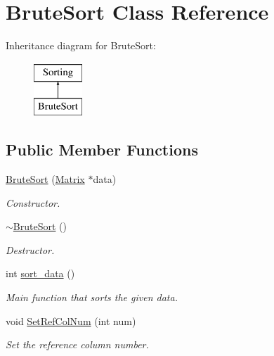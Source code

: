 \hypertarget{classBruteSort}{
\section{BruteSort Class Reference}
\label{d7/d98/classBruteSort}
}
Inheritance diagram for BruteSort:\begin{figure}[H]
\begin{center}
\leavevmode
\includegraphics[height=2cm]{d7/d98/classBruteSort}
\end{center}
\end{figure}
\subsection*{Public Member Functions}
\begin{DoxyCompactItemize}
\item 
\hyperlink{classBruteSort_af173d86f16480c1e08de8cb156d29205}{BruteSort} (\hyperlink{classMatrix}{Matrix} $\ast$data)
\begin{DoxyCompactList}\small\item\em Constructor. \item\end{DoxyCompactList}\item 
\hypertarget{classBruteSort_a0bbf682f921452842e844599b1f02c0a}{
\hyperlink{classBruteSort_a0bbf682f921452842e844599b1f02c0a}{$\sim$BruteSort} ()}
\label{d7/d98/classBruteSort_a0bbf682f921452842e844599b1f02c0a}

\begin{DoxyCompactList}\small\item\em Destructor. \item\end{DoxyCompactList}\item 
int \hyperlink{classBruteSort_ae1345f8f8ddc289832816d900226fc1e}{sort\_\-data} ()
\begin{DoxyCompactList}\small\item\em Main function that sorts the given data. \item\end{DoxyCompactList}\item 
\hypertarget{classBruteSort_a7e765945892481b5ca40fd88ab5f1e6f}{
void \hyperlink{classBruteSort_a7e765945892481b5ca40fd88ab5f1e6f}{SetRefColNum} (int num)}
\label{d7/d98/classBruteSort_a7e765945892481b5ca40fd88ab5f1e6f}

\begin{DoxyCompactList}\small\item\em Set the reference column number. \item\end{DoxyCompactList}\end{DoxyCompactItemize}


